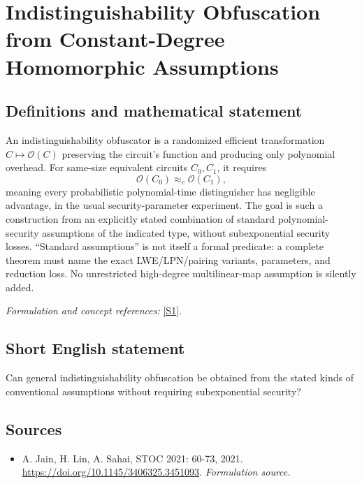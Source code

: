 \documentclass[11pt]{article}
\begin{document}
\section*{\texorpdfstring{Indistinguishability Obfuscation from Constant-Degree Homomorphic Assumptions}{Indistinguishability Obfuscation from Constant-Degree Homomorphic Assumptions}}\label{142}
\subsection{Definitions and mathematical statement}
An indistinguishability obfuscator is a randomized efficient transformation $C\mapsto\mathcal O(C)$ preserving the circuit's function and producing only polynomial overhead. For same-size equivalent circuits $C_0,C_1$, it requires
\[
 \mathcal O(C_0)\approx_c\mathcal O(C_1),
\]
meaning every probabilistic polynomial-time distinguisher has negligible advantage, in the usual security-parameter experiment. The goal is such a construction from an explicitly stated combination of standard polynomial-security assumptions of the indicated type, without subexponential security losses. ``Standard assumptions'' is not itself a formal predicate: a complete theorem must name the exact LWE/LPN/pairing variants, parameters, and reduction loss. No unrestricted high-degree multilinear-map assumption is silently added.
\par\smallskip\textit{Formulation and concept references:} \href{https://doi.org/10.1145/3406325.3451093}{[S1]}.

\subsection{Short English statement}
Can general indistinguishability obfuscation be obtained from the stated kinds of conventional assumptions without requiring subexponential security?
\subsection{Sources}
\begin{itemize}
\item[S1]A. Jain, H. Lin, A. Sahai, STOC 2021: 60-73, 2021.
\url{https://doi.org/10.1145/3406325.3451093}.
\textit{Formulation source.}
\end{itemize}
\end{document}

